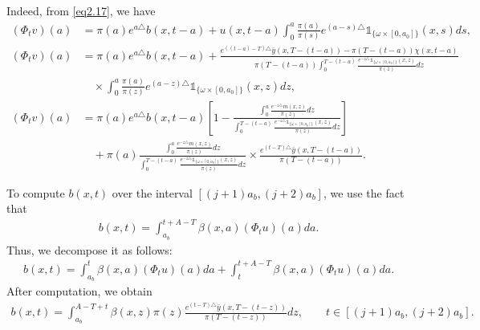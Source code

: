 \documentclass[10pt, a4]{amsart}
\makeatletter
\theoremstyle{plain}
\theoremstyle{definition}
\theoremstyle{remark}
\renewenvironment{proof}[1][\proofname]{\par
  \pushQED{\qed}%
  \normalfont \topsep6\p@\@plus6\p@\relax
  \trivlist
  \item[\hskip\labelsep
        \itshape
    #1\ \ref{#1}.]\ignorespaces
}{%
  \popQED\endtrivlist\@endpefalse
}
\numberwithin{equation}{section}
\makeatother
\begin{document}
\begin{proof}[of Proposition \ref{pr2.3}]
Indeed, from \eqref{eq2.17}, we have  
\begin{align*}
(\Phi_t v)(a) &= \pi(a)e^{a\triangle}b(x,t-a) + u(x,t-a) \int_{0}^{a} \frac{\pi(a)}{\pi(s)} e^{(a-s)\triangle} \mathds{1}_{\lbrace\omega\times[0,a_0]\rbrace}(x,s) ds, \\
(\Phi_t v)(a) &= \pi(a)e^{a\triangle}b(x,t-a) + \frac{e^{((t-a)-T)\triangle} \bar{y}(x,T-(t-a)) - \pi(T-(t-a)) \chi(x,t-a)}{\pi(T-(t-a)) \int_{0}^{T-(t-a)} \frac{e^{-z\triangle} \mathds{1}_{\lbrace\omega\times[0,a_0]\rbrace}(x,z)}{\pi(z)} dz} \\
&\quad \times \int_{0}^{a} \frac{\pi(a)}{\pi(z)} e^{(a-z)\triangle} \mathds{1}_{\lbrace\omega\times[0,a_0]\rbrace}(x,z) dz, \\
(\Phi_t v)(a) &= \pi(a)e^{a\triangle}b(x,t-a) \left[1 - \frac{\int_{0}^{a} \frac{e^{-z\triangle} m(x,z)}{\pi(z)} dz}{\int_{0}^{T-(t-a)} \frac{e^{-z\triangle} \mathds{1}_{\lbrace\omega\times[0,a_0]\rbrace}(x,z)}{\pi(z)} dz} \right] \\
&\quad + \pi(a) \frac{\int_{0}^{a} \frac{e^{-z\triangle} m(x,z)}{\pi(z)} dz}{\int_{0}^{T-(t-a)} \frac{e^{-z\triangle} \mathds{1}_{\lbrace\omega\times[0,a_0]\rbrace}(x,z)}{\pi(z)} dz} \times \frac{e^{(t-T)\triangle} \bar{y}(x,T-(t-a))}{\pi(T-(t-a))}.
\end{align*}  

To compute \( b(x,t) \) over the interval \([(j+1)a_b,(j+2)a_b]\), we use the fact that  
\begin{align*}
b(x,t) = \int_{a_b}^{t+A-T} \beta(x,a) (\Phi_t u)(a) da.
\end{align*}  
Thus, we decompose it as follows:  
\begin{align}
b(x,t) = \int_{a_b}^{t} \beta(x,a) (\Phi_t u)(a) da + \int_{t}^{t+A-T} \beta(x,a) (\Phi_t u)(a) da.
\end{align}  
After computation, we obtain  
\begin{align}
b(x,t) = \int_{a_b}^{A-T+t} \beta(x,z) \pi(z) \frac{e^{(t-T)\triangle} \bar{y}(x,T-(t-z))}{\pi(T-(t-z))} dz, \qquad t\in[(j+1)a_b,(j+2)a_b].
\end{align}  


\end{proof}
\end{document}
